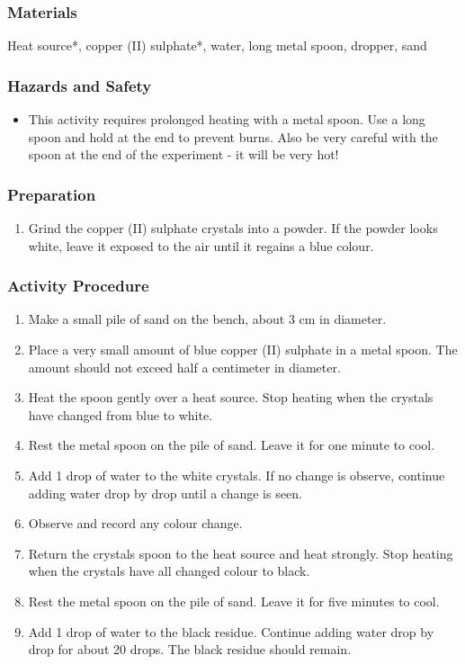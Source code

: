 \subsubsection*{Materials}
Heat source*, copper (II) sulphate*, water, long metal spoon, dropper, sand

\subsubsection*{Hazards and Safety}
\begin{itemize}
\item{This activity requires prolonged heating with a metal spoon. Use a long spoon and hold at the end to prevent burns. Also be very careful with the spoon at the end of the experiment - it will be very hot!}
\end{itemize}

\subsubsection*{Preparation}
\begin{enumerate}
\item{Grind the copper (II) sulphate crystals into a powder. If the powder looks white, leave it exposed to the air until it regains a blue colour.}
\end{enumerate}

\subsubsection*{Activity Procedure}
\begin{enumerate}
\item{Make a small pile of sand on the bench, about 3 cm in diameter.}
\item{Place a very small amount of blue copper (II) sulphate in a metal spoon. The amount should not exceed half a centimeter in diameter.}
\item{Heat the spoon gently over a heat source. Stop heating when the crystals have changed from blue to white.}
\item{Rest the metal spoon on the pile of sand. Leave it for one minute to cool.}
\item{Add 1 drop of water to the white crystals. If no change is observe, continue adding water drop by drop until a change is seen.}
\item{Observe and record any colour change.}
\item{Return the crystals spoon to the heat source and heat strongly. Stop heating when the crystals have all changed colour to black.}
\item{Rest the metal spoon on the pile of sand. Leave it for five minutes to cool.}
\item{Add 1 drop of water to the black residue. Continue adding water drop by drop for about 20 drops. The black residue should remain.}
\end{enumerate}

